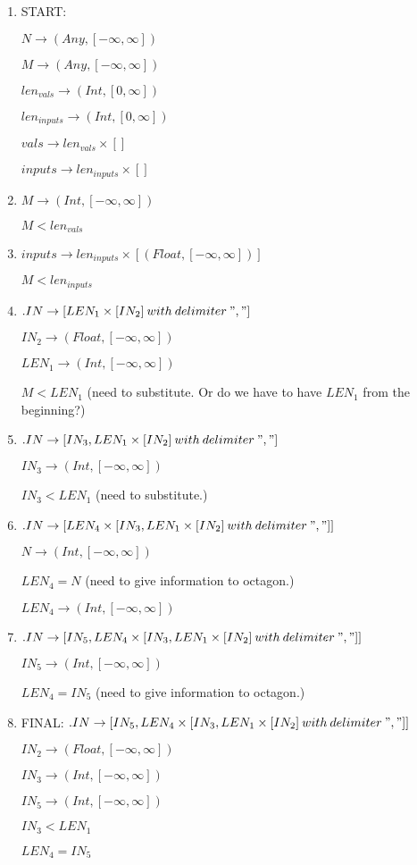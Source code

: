 \documentclass[11pt]{article}
\begin{document}
\begin{enumerate}
  \item START:
  
  $N \rightarrow (Any, [-\infty, \infty])$
  
  $M \rightarrow (Any, [-\infty, \infty])$
  
  $len_{vals} \rightarrow (Int, [0, \infty])$
  
  $len_{inputs} \rightarrow (Int, [0, \infty])$
  
  $vals \rightarrow len_{vals} \times []$
  
  $inputs \rightarrow len_{inputs} \times []$
  
  \item $M \rightarrow (Int, [-\infty, \infty])$
  
  $M < len_{vals}$
  
  \item $inputs \rightarrow len_{inputs} \times [(Float, [-\infty, \infty])]$
  
  $M < len_{inputs}$
  
  \item $.IN \rightarrow [LEN_1 \times [IN_2]\:with\:delimiter\:","]$
  
  $IN_2 \rightarrow (Float, [-\infty, \infty])$
  
  $LEN_1 \rightarrow (Int, [-\infty, \infty])$
  
  $M < LEN_1$ (need to substitute. Or do we have to have $LEN_1$ from the beginning?)
  
  \item $.IN \rightarrow [IN_3, LEN_1 \times [IN_2]\:with\:delimiter\:","]$
  
  $IN_3 \rightarrow (Int, [-\infty, \infty])$
  
  $IN_3 < LEN_1$ (need to substitute.)
  
  \item $.IN \rightarrow [LEN_4 \times [IN_3, LEN_1 \times [IN_2]\:with\:delimiter\:","]]$
  
  $N \rightarrow (Int, [-\infty, \infty])$
  
  $LEN_4 = N$ (need to give information to octagon.)
  
  $LEN_4 \rightarrow (Int, [-\infty, \infty])$
  
  \item $.IN \rightarrow [IN_5, LEN_4 \times [IN_3, LEN_1 \times [IN_2]\:with\:delimiter\:","]]$
  
  $IN_5 \rightarrow (Int, [-\infty, \infty])$
  
  $LEN_4 = IN_5$ (need to give information to octagon.)
  
  \item FINAL: $.IN \rightarrow [IN_5, LEN_4 \times [IN_3, LEN_1 \times [IN_2]\:with\:delimiter\:","]]$
  
  $IN_2 \rightarrow (Float, [-\infty, \infty])$
  
  $IN_3 \rightarrow (Int, [-\infty, \infty])$
  
  $IN_5 \rightarrow (Int, [-\infty, \infty])$
  
  $IN_3 < LEN_1$
  
  $LEN_4 = IN_5$
\end{enumerate}
\end{document}
